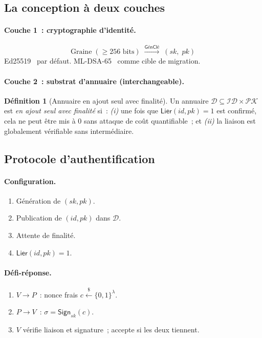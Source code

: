 \documentclass[11pt,a4paper]{article}
\theoremstyle{definition}
\newtheorem{definition}[theorem]{Définition}
\begin{document}
\subsection{La conception à deux couches}

\paragraph{Couche 1~: cryptographie d'identité.}
\[
\text{Graine}\;(\geq 256\text{ bits})
\;\xrightarrow{\mathsf{GénClé}}\;(\mathit{sk},\;\mathit{pk})
\]
Ed25519~\cite{RFC8032} par défaut. ML-DSA-65~\cite{FIPS204} comme
cible de migration.

\paragraph{Couche 2~: substrat d'annuaire (interchangeable).}

\begin{definition}[Annuaire en ajout seul avec finalité]
\label{def:directory}
Un annuaire $\mathcal{D} \subseteq \mathcal{ID} \times \mathcal{PK}$
est \emph{en ajout seul avec finalité} si~: \emph{(i)} une fois que
$\mathsf{Lier}(\mathit{id}, \mathit{pk}) = 1$ est confirmé, cela ne
peut être mis à $0$ sans attaque de coût quantifiable~; et
\emph{(ii)} la liaison est globalement vérifiable sans intermédiaire.
\end{definition}

\subsection{Protocole d'authentification}

\paragraph{Configuration.}
\begin{enumerate}
  \item Génération de $(\mathit{sk}, \mathit{pk})$.
  \item Publication de $(\mathit{id}, \mathit{pk})$ dans $\mathcal{D}$.
  \item Attente de finalité.
  \item $\mathsf{Lier}(\mathit{id}, \mathit{pk}) = 1$.
\end{enumerate}

\paragraph{Défi-réponse.}
\begin{enumerate}
  \item $V \to P$~: nonce frais $c \xleftarrow{\$} \{0,1\}^\lambda$.
  \item $P \to V$~: $\sigma = \mathsf{Sign}_{\mathit{sk}}(c)$.
  \item $V$ vérifie liaison et signature~; accepte si les deux tiennent.
\end{enumerate}
\end{document}
